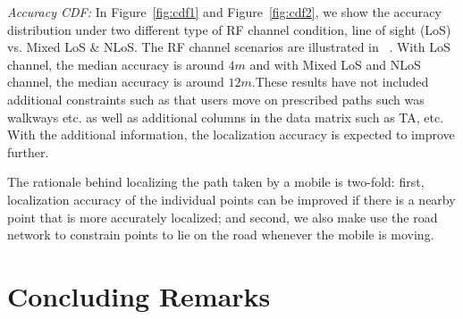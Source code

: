 \documentclass[conference, 10pt]{IEEEtran}
\begin{document}
{\em Accuracy CDF:} In Figure~\ref{fig:cdf1} and Figure~\ref{fig:cdf2}, we show the
accuracy distribution under two different type of RF channel condition, line of sight (LoS) vs. Mixed LoS \& NLoS. The RF channel scenarios are illustrated in
~\cite{3gpp38901}. With LoS channel, the median accuracy is around
$4m$ and with Mixed LoS and NLoS channel, the median accuracy is around $12m$.These results have not included additional constraints such as that users move on prescribed paths such was walkways etc. as well as additional columns in the data matrix such as TA, etc. 
With the additional information, the localization accuracy is expected to improve further.

The rationale behind localizing the path taken by a mobile is two-fold: first,
localization accuracy of the individual points can be improved if there is a
nearby point that is more accurately localized; and second, we also make use the
road network to constrain points to lie on the road whenever the mobile is
moving. 



\section{Concluding Remarks}
\label{sec:concl}





%
%    

{%


}
\end{document}
